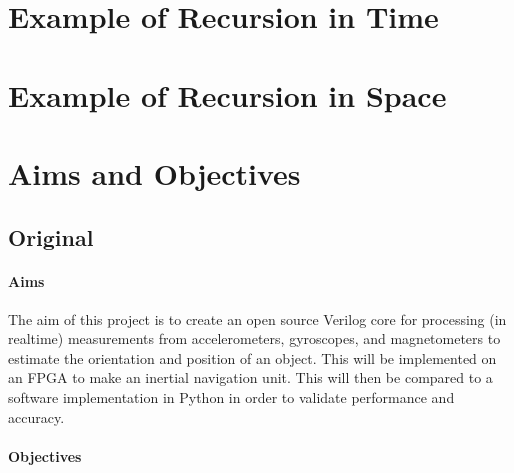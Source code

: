 \documentclass[12pt]{article}
\begin{document}
\printbibliography

\appendix

\renewcommand{\thesection}{Appendix \Alph{section}}

\section{Example of Recursion in Time}
\label{recursion_time}



\section{Example of Recursion in Space}
\label{recursion_space}



\section{Aims and Objectives}

\subsection*{Original}

\paragraph{Aims}

The aim of this project is to create an open source Verilog core for processing (in realtime) measurements from accelerometers, gyroscopes, and magnetometers to estimate the orientation and position of an object. This will be implemented on an FPGA to make an inertial navigation unit. This will then be compared to a software implementation in Python in order to validate performance and accuracy.

\paragraph{Objectives}
\end{document}
